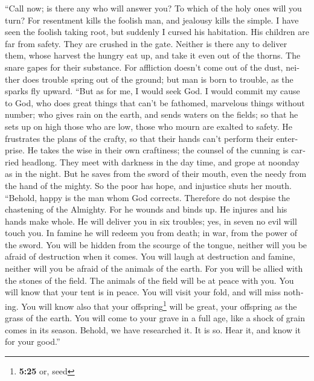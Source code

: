 \begin{paracol}{2}
\begin{otherlanguage}{english}
 ``Call now; is there any who will answer you? To which of
the holy ones will you turn?  For resentment kills the
foolish man, and jealousy kills the simple.  I have seen
the foolish taking root, but suddenly I cursed his habitation.
 His children are far from safety. They are crushed in the
gate. Neither is there any to deliver them,  whose harvest
the hungry eat up, and take it even out of the thorns. The snare gapes
for their substance.  For affliction doesn't come out of
the dust, neither does trouble spring out of the ground; 
but man is born to trouble, as the sparks fly upward. 
``But as for me, I would seek God. I would commit my cause to God,
 who does great things that can't be fathomed, marvelous
things without number;  who gives rain on the earth, and
sends waters on the fields;  so that he sets up on high
those who are low, those who mourn are exalted to safety.
 He frustrates the plans of the crafty, so that their
hands can't perform their enterprise.  He takes the wise
in their own craftiness; the counsel of the cunning is carried headlong.
 They meet with darkness in the day time, and grope at
noonday as in the night.  But he saves from the sword of
their mouth, even the needy from the hand of the mighty. 
So the poor has hope, and injustice shuts her mouth. 
``Behold, happy is the man whom God corrects. Therefore do not despise
the chastening of the Almighty.  For he wounds and binds
up. He injures and his hands make whole.  He will deliver
you in six troubles; yes, in seven no evil will touch you.
 In famine he will redeem you from death; in war, from
the power of the sword.  You will be hidden from the
scourge of the tongue, neither will you be afraid of destruction when it
comes.  You will laugh at destruction and famine, neither
will you be afraid of the animals of the earth.  For you
will be allied with the stones of the field. The animals of the field
will be at peace with you.  You will know that your tent
is in peace. You will visit your fold, and will miss nothing.
 You will know also that your offspring\footnote{\textbf{5:25}
  or, seed} will be great, your offspring as the grass of the earth.
 You will come to your grave in a full age, like a shock
of grain comes in its season.  Behold, we have researched
it. It is so. Hear it, and know it for your good.''


\end{otherlanguage}
\end{paracol}
